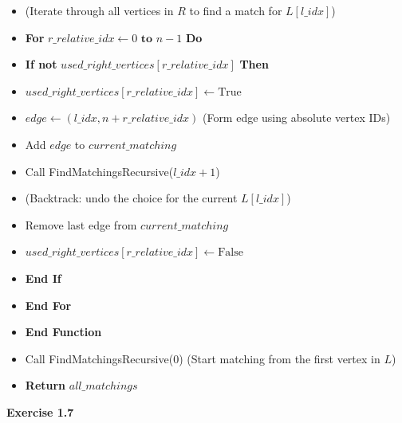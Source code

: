 \documentclass{article}
\begin{document}
\begin{itemize}
\begin{itemize}
        \item \hspace{1cm} (Iterate through all vertices in $R$ to find a match for $L[l\_idx]$)
        \item \hspace{1cm} \textbf{For} $r\_relative\_idx \gets 0 \textbf{ to } n-1$ \textbf{Do}
        \item \hspace{1.5cm} \textbf{If not} $used\_right\_vertices[r\_relative\_idx]$ \textbf{Then}
        \item \hspace{2cm} $used\_right\_vertices[r\_relative\_idx] \gets \text{True}$
        \item \hspace{2cm} $edge \gets (l\_idx, n + r\_relative\_idx)$ (Form edge using absolute vertex IDs)
        \item \hspace{2cm} Add $edge$ to $current\_matching$
        \item \hspace{2cm} Call FindMatchingsRecursive($l\_idx + 1$)
        \item \hspace{2cm} (Backtrack: undo the choice for the current $L[l\_idx]$)
        \item \hspace{2cm} Remove last edge from $current\_matching$
        \item \hspace{2cm} $used\_right\_vertices[r\_relative\_idx] \gets \text{False}$
        \item \hspace{1.5cm} \textbf{End If}
        \item \hspace{1cm} \textbf{End For}
        \item \hspace{0.5cm} \textbf{End Function}
        
        \item \hspace{0.5cm} Call FindMatchingsRecursive($0$) (Start matching from the first vertex in $L$)
        \item \hspace{0.5cm} \textbf{Return} $all\_matchings$
    \end{itemize}
\end{itemize}

\textbf{Exercise 1.7}
\end{document}
